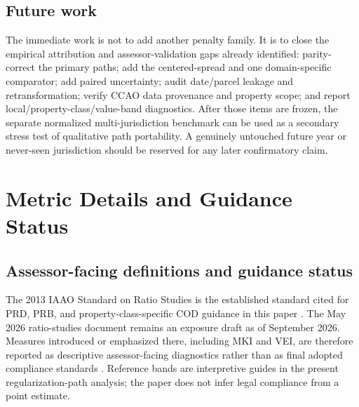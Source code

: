 \documentclass[10pt]{article}
\theoremstyle{definition}
\newcommand{\1}{\mathbf{1}}
\begin{document}
\subsection{Future work}
The immediate work is not to add another penalty family. It is to close the empirical attribution and assessor-validation gaps already identified: parity-correct the primary paths; add the centered-spread and one domain-specific comparator; add paired uncertainty; audit date/parcel leakage and retransformation; verify CCAO data provenance and property scope; and report local/property-class/value-band diagnostics. After those items are frozen, the separate normalized multi-jurisdiction benchmark can be used as a secondary stress test of qualitative path portability. A genuinely untouched future year or never-seen jurisdiction should be reserved for any later confirmatory claim.


\appendix

\section{Metric Details and Guidance Status}
\label{app:metrics}

\subsection{Assessor-facing definitions and guidance status}

The 2013 IAAO Standard on Ratio Studies is the established standard cited for PRD, PRB, and property-class-specific COD guidance in this paper \cite{IAAO2013Ratio}. The May 2026 ratio-studies document remains an exposure draft as of September 2026. Measures introduced or emphasized there, including MKI and VEI, are therefore reported as descriptive assessor-facing diagnostics rather than as final adopted compliance standards \cite{IAAO2026ExposureRatio}. Reference bands are interpretive guides in the present regularization-path analysis; the paper does not infer legal compliance from a point estimate.
\end{document}
